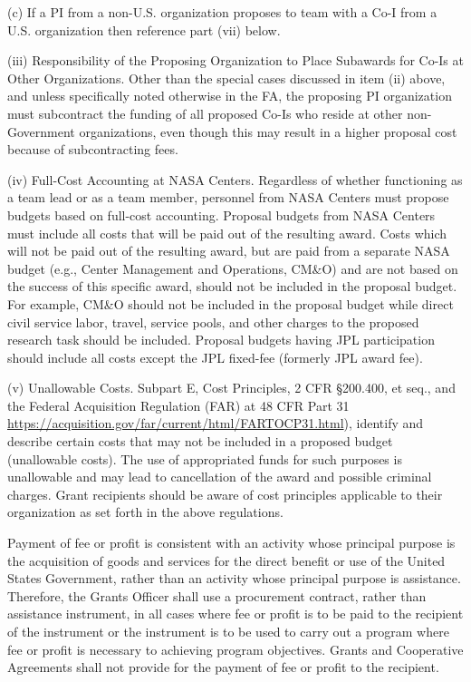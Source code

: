 \documentclass[12pt]{article}
\begin{document}
(c) If a PI from a non-U.S. organization proposes to team with a Co-I
from a U.S. organization then reference part (vii) below.

(iii) Responsibility of the Proposing Organization to Place Subawards
for Co-Is at Other Organizations. Other than the special cases
discussed in item (ii) above, and unless specifically noted otherwise
in the FA, the proposing PI organization must subcontract the funding
of all proposed Co-Is who reside at other non-Government
organizations, even though this may result in a higher proposal cost
because of subcontracting fees.

(iv) Full-Cost Accounting at NASA Centers. Regardless of whether
functioning as a team lead or as a team member, personnel from NASA
Centers must propose budgets based on full-cost accounting. Proposal
budgets from NASA Centers must include all costs that will be paid out
of the resulting award. Costs which will not be paid out of the
resulting award, but are paid from a separate NASA budget (e.g.,
Center Management and Operations, CM\&O) and are not based on the
success of this specific award, should not be included in the proposal
budget. For example, CM\&O should not be included in the proposal
budget while direct civil service labor, travel, service pools, and
other charges to the proposed research task should be
included. Proposal budgets having JPL participation should include all
costs except the JPL fixed-fee (formerly JPL award fee).

(v) Unallowable Costs. Subpart E, Cost Principles, 2 CFR \S200.400, et
seq., and the Federal Acquisition Regulation (FAR) at 48 CFR Part 31
\url{https://acquisition.gov/far/current/html/FARTOCP31.html}), identify and
describe certain costs that may not be included in a proposed budget
(unallowable costs). The use of appropriated funds for such purposes
is unallowable and may lead to cancellation of the award and possible
criminal charges. Grant recipients should be aware of cost principles
applicable to their organization as set forth in the above
regulations.

Payment of fee or profit is consistent with an activity whose
principal purpose is the acquisition of goods and services for the
direct benefit or use of the United States Government, rather than an
activity whose principal purpose is assistance. Therefore, the Grants
Officer shall use a procurement contract, rather than assistance
instrument, in all cases where fee or profit is to be paid to the
recipient of the instrument or the instrument is to be used to carry
out a program where fee or profit is necessary to achieving program
objectives. Grants and Cooperative Agreements shall not provide for
the payment of fee or profit to the recipient.
\end{document}
